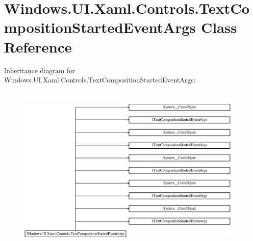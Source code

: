 \hypertarget{class_windows_1_1_u_i_1_1_xaml_1_1_controls_1_1_text_composition_started_event_args}{}\section{Windows.\+U\+I.\+Xaml.\+Controls.\+Text\+Composition\+Started\+Event\+Args Class Reference}
\label{class_windows_1_1_u_i_1_1_xaml_1_1_controls_1_1_text_composition_started_event_args}
Inheritance diagram for Windows.\+U\+I.\+Xaml.\+Controls.\+Text\+Composition\+Started\+Event\+Args\+:\begin{figure}[H]
\begin{center}
\leavevmode
\includegraphics[height=8.508287cm]{class_windows_1_1_u_i_1_1_xaml_1_1_controls_1_1_text_composition_started_event_args}
\end{center}
\end{figure}
